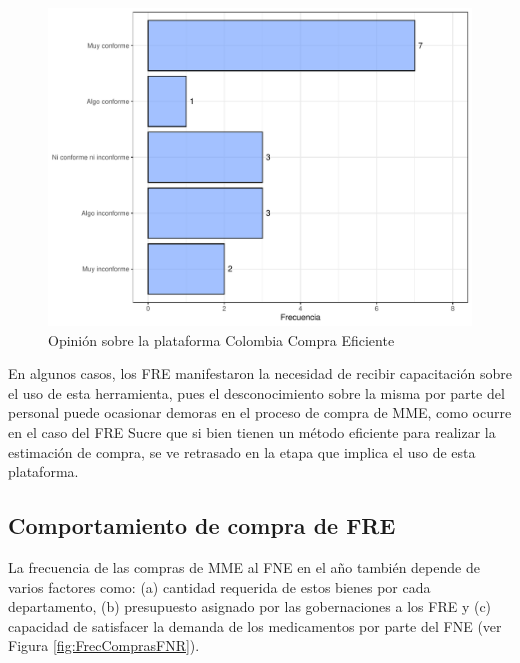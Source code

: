 \documentclass[
]{book}
\begin{document}
\begin{figure}
\includegraphics[width=1\linewidth]{InformeFinal_files/figure-latex/ColombiaCompra-1} \caption{Opinión sobre la plataforma Colombia Compra Eficiente}\label{fig:ColombiaCompra}
\end{figure}

En algunos casos, los FRE manifestaron la necesidad de recibir capacitación sobre el uso de esta herramienta, pues el desconocimiento sobre la misma por parte del personal puede ocasionar demoras en el proceso de compra de MME, como ocurre en el caso del FRE Sucre que si bien tienen un método eficiente para realizar la estimación de compra, se ve retrasado en la etapa que implica el uso de esta plataforma.

\hypertarget{comportamiento-de-compra-de-fre}{%
\subsection{Comportamiento de compra de FRE}\label{comportamiento-de-compra-de-fre}}

La frecuencia de las compras de MME al FNE en el año también depende de varios factores como: (a) cantidad requerida de estos bienes por cada departamento, (b) presupuesto asignado por las gobernaciones a los FRE y (c) capacidad de satisfacer la demanda de los medicamentos por parte del FNE (ver Figura \ref{fig:FrecComprasFNR}).
\end{document}
